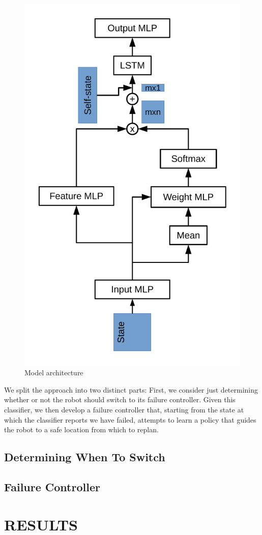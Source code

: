 \documentclass[letterpaper, 10 pt, conference]{ieeeconf}  %
\begin{document}
	\begin{figure}
		\centering
		\includegraphics[height=\linewidth, angle=270]{model_arch.pdf}
		\caption{Model architecture}
		\label{fig:model_arch}
	\end{figure}
	
	We split the approach into two distinct parts: First, we consider just determining whether or not the robot should switch to its failure controller. Given this classifier, we then develop a failure controller that, starting from the state at which the classifier reports we have failed, attempts to learn a policy that guides the robot to a safe location from which to replan.
	
	\subsection{Determining When To Switch}
	
	\subsection{Failure Controller}

\section{RESULTS}
\end{document}
